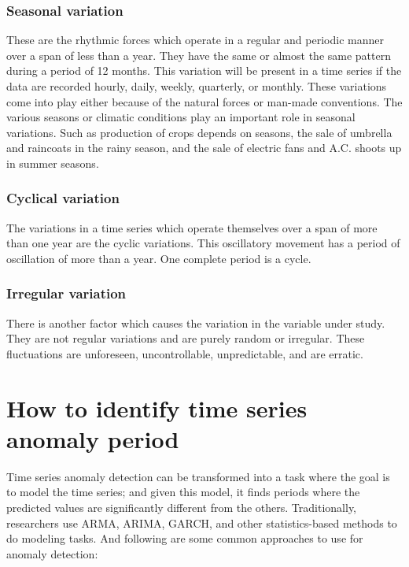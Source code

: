 \subsubsection{Seasonal variation}
These are the rhythmic forces which operate in a regular and periodic manner over a span of less than a year. They have the same or almost the same pattern during a period of 12 months. This variation will be present in a time series if the data are recorded hourly, daily, weekly, quarterly, or monthly.
These variations come into play either because of the natural forces or man-made conventions. The various seasons or climatic conditions play an important role in seasonal variations. Such as production of crops depends on seasons, the sale of umbrella and raincoats in the rainy season, and the sale of electric fans and A.C. shoots up in summer seasons.
\subsubsection{Cyclical variation}
The variations in a time series which operate themselves over a span of more than one year are the cyclic variations. This oscillatory movement has a period of oscillation of more than a year. One complete period is a cycle.
\subsubsection{Irregular variation}
There is another factor which causes the variation in the variable under study. They are not regular variations and are purely random or irregular. These fluctuations are unforeseen, uncontrollable, unpredictable, and are erratic. 

\section{How to identify time series anomaly period}

Time series anomaly detection can be transformed into a task where the goal is to model the time series; and given this model, it finds periods where the predicted values are significantly different from the others. Traditionally, researchers use ARMA, ARIMA, GARCH, and other statistics-based methods to do modeling tasks. And following are some common approaches to use for anomaly detection:
